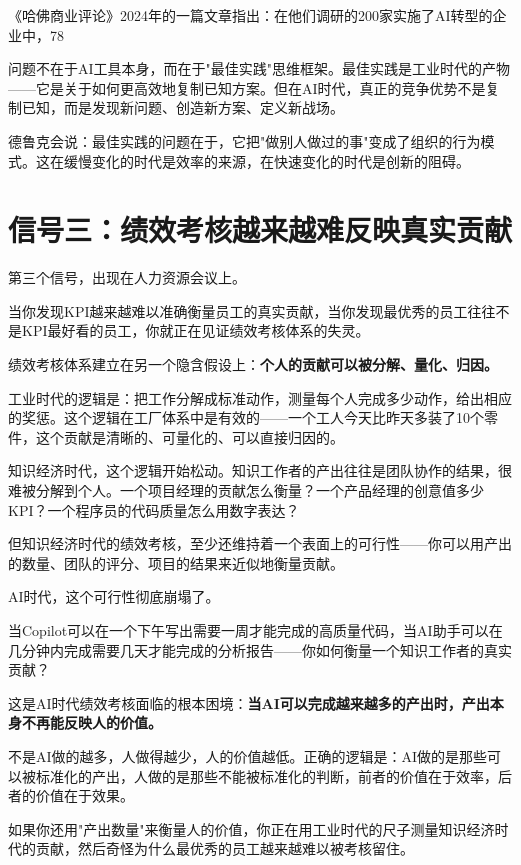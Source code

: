 《哈佛商业评论》2024年的一篇文章指出：在他们调研的200家实施了AI转型的企业中，78%

问题不在于AI工具本身，而在于"最佳实践"思维框架。最佳实践是工业时代的产物——它是关于如何更高效地复制已知方案。但在AI时代，真正的竞争优势不是复制已知，而是发现新问题、创造新方案、定义新战场。

德鲁克会说：最佳实践的问题在于，它把"做别人做过的事"变成了组织的行为模式。这在缓慢变化的时代是效率的来源，在快速变化的时代是创新的阻碍。


\section{信号三：绩效考核越来越难反映真实贡献}


第三个信号，出现在人力资源会议上。

当你发现KPI越来越难以准确衡量员工的真实贡献，当你发现最优秀的员工往往不是KPI最好看的员工，你就正在见证绩效考核体系的失灵。

绩效考核体系建立在另一个隐含假设上：\textbf{个人的贡献可以被分解、量化、归因。}

工业时代的逻辑是：把工作分解成标准动作，测量每个人完成多少动作，给出相应的奖惩。这个逻辑在工厂体系中是有效的——一个工人今天比昨天多装了10个零件，这个贡献是清晰的、可量化的、可以直接归因的。

知识经济时代，这个逻辑开始松动。知识工作者的产出往往是团队协作的结果，很难被分解到个人。一个项目经理的贡献怎么衡量？一个产品经理的创意值多少KPI？一个程序员的代码质量怎么用数字表达？

但知识经济时代的绩效考核，至少还维持着一个表面上的可行性——你可以用产出的数量、团队的评分、项目的结果来近似地衡量贡献。

AI时代，这个可行性彻底崩塌了。

当Copilot可以在一个下午写出需要一周才能完成的高质量代码，当AI助手可以在几分钟内完成需要几天才能完成的分析报告——你如何衡量一个知识工作者的真实贡献？

这是AI时代绩效考核面临的根本困境：\textbf{当AI可以完成越来越多的产出时，产出本身不再能反映人的价值。}

不是AI做的越多，人做得越少，人的价值越低。正确的逻辑是：AI做的是那些可以被标准化的产出，人做的是那些不能被标准化的判断，前者的价值在于效率，后者的价值在于效果。

如果你还用"产出数量"来衡量人的价值，你正在用工业时代的尺子测量知识经济时代的贡献，然后奇怪为什么最优秀的员工越来越难以被考核留住。

